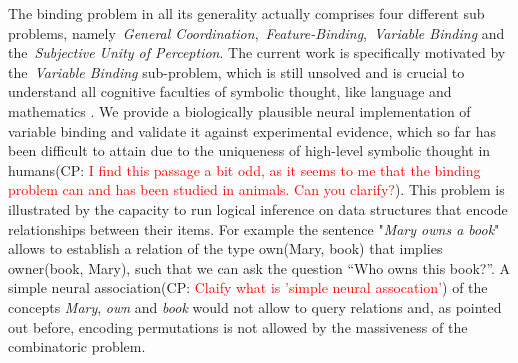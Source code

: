 \documentclass[10pt]{article}
\newcommand{\noteCP}[1]{(CP: \textcolor{red}{#1})}
\begin{document}
The binding problem in all its generality actually comprises four different sub problems, namely~\emph{General Coordination},~\emph{Feature-Binding},~\emph{Variable Binding} and
the~\emph{Subjective Unity of Perception}\cite{Feldman_2012}. The current
work is specifically motivated  by the~\emph{Variable Binding}
sub-problem, which is still unsolved and is crucial to understand all
cognitive faculties of symbolic thought, like language and mathematics
\cite{Marcus2001-the-algebraic-mind,smolensky2006harmonic}. We
provide a biologically plausible neural implementation of variable
binding and validate it against experimental evidence, which so far
has been difficult to attain due to the uniqueness of high-level
symbolic thought in humans\noteCP{I find this passage a bit odd, as it seems to me that the binding problem can and has been studied in animals. Can you clarify?}. This problem is illustrated by the capacity
to run logical inference on data structures that encode relationships
between their items. For example the sentence "\emph{Mary owns a book}"
allows to establish a relation of the type own(Mary, book) that implies
owner(book, Mary), such that we can ask the question ``Who owns this
book?''. A simple neural association\noteCP{Claify what is 'simple neural assocation'} of the concepts \emph{Mary},
\emph{own} and \emph{book} would not allow to query relations and, as
pointed out before, encoding permutations is not allowed by the
massiveness of the combinatoric problem.
\end{document}

